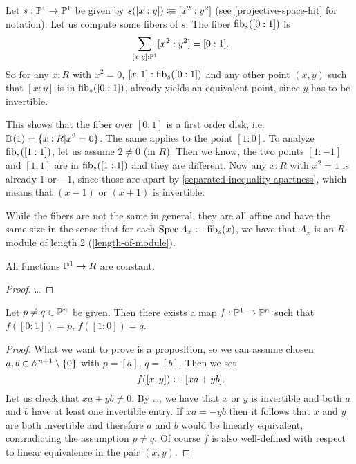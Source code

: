 \begin{example}
  Let $s:\mathbb{P}^1\to \mathbb{P}^1$ be given by $s([x:y])\vcentcolon\mspace{-1.2mu}\equiv [x^2:y^2]$
  (see \cref{projective-space-hit} for notation).
  Let us compute some fibers of $s$. The fiber $\mathrm{fib}_s([0:1])$ is
  \[
    \sum_{[x:y]:\bP^1}[x^2:y^2]=[0:1]\rlap{.}
  \]
  So for any $x:R$ with $x^2=0$, $[x,1]:\mathrm{fib}_s([0:1])$  and
  any other point $(x,y)$ such that $[x:y]$ is in $\mathrm{fib}_s([0:1])$,
  already yields an equivalent point, since $y$ has to be invertible.

  This shows that the fiber over $[0:1]$ is a first order disk, i.e. $\mathbb{D}(1)=\{x:R|x^2=0\}$.
  The same applies to the point $[1:0]$.
  To analyze $\mathrm{fib}_s([1:1])$, let us assume $2\neq 0$ (in $R$).
  Then we know, the two points $[1:-1]$ and $[1:1]$ are in $\mathrm{fib}_s([1:1])$ and they are different.
  Now any $x:R$ with $x^2=1$ is already $1$ or $-1$,
  since those are apart by \cref{separated-inequality-apartness}, which means that $(x-1)$ or $(x+1)$ is invertible.

  While the fibers are not the same in general,
  they are all affine and have the same size in the sense that for each $\operatorname{Spec} A_x\vcentcolon\mspace{-1.2mu}\equiv \mathrm{fib}_s(x)$,
  we have that $A_x$ is an $R$-module of length 2 (\cref{length-of-module}).
\end{example}

\begin{lemma}
  All functions $\mathbb{P}^1 \to R$ are constant.
\end{lemma}

\begin{proof}
  \dots
\end{proof}

\begin{lemma}
  Let $p \neq q \in \mathbb{P}^n$ be given.
  Then there exists a map $f : \mathbb{P}^1 \to \mathbb{P}^n$
  such that $f([0 : 1]) = p$, $f([1 : 0]) = q$.
\end{lemma}

\begin{proof}
  What we want to prove is a proposition,
  so we can assume chosen $a, b \in \mathbb{A}^{n+1} \setminus \{0\}$
  with $p = [a]$, $q = [b]$.
  Then we set
  \[ f([x, y]) \colonequiv [xa + yb] \rlap{.}\]
  Let us check that $xa + yb \neq 0$.
  By \dots,
  we have that $x$ or $y$ is invertible
  and both $a$ and $b$ have at least one invertible entry.
  If $xa = - yb$
  then it follows that $x$ and $y$ are both invertible
  and therefore $a$ and $b$ would be linearly equivalent,
  contradicting the assumption $p \neq q$.
  Of course $f$ is also well-defined
  with respect to linear equivalence in the pair $(x, y)$.
\end{proof}

